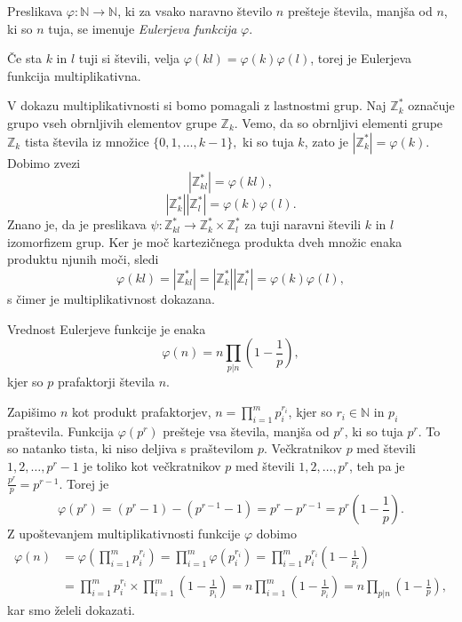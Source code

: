 \documentclass[mat1]{fmfdelo}
\begin{document}
\begin{definicija}
Preslikava \( \varphi \colon \mathbb{N} \rightarrow \mathbb{N}\), ki za vsako naravno število $n$ prešteje števila, manjša od $n$, ki so $n$ tuja, se imenuje \emph{Eulerjeva funkcija} $\varphi$.
\end{definicija}

\begin{trditev}
\label{trd:MultipEuler}
Če sta $k$ in $l$ tuji si števili, velja $\varphi (kl) = \varphi (k) \varphi (l)$, torej je Eulerjeva funkcija multiplikativna.
\end{trditev}

\begin{dokaz}
V dokazu multiplikativnosti si bomo pomagali z lastnostmi grup. 
Naj $\mathbb{Z}_{k}^\ast $ označuje grupo vseh obrnljivih elementov grupe $\mathbb{Z}_{k}$. Vemo, da so obrnljivi elementi grupe $\mathbb{Z}_{k}$ tista števila iz množice \( \{0, 1, \ldots, k-1 \}, \) ki so tuja $k$, zato je $|\mathbb{Z}_{k}^\ast| = \varphi(k).$  
Dobimo zvezi
\[ |\mathbb{Z}_{kl}^\ast| = \varphi(kl), \]
\[ |\mathbb{Z}_{k}^\ast| |\mathbb{Z}_{l}^\ast| = \varphi(k) \varphi(l).\]
Znano je, da je preslikava \( \psi \colon \mathbb{Z}_{kl}^\ast \rightarrow \mathbb{Z}_{k}^\ast \times \mathbb{Z}_{l}^\ast \) za tuji naravni števili $k$ in $l$ izomorfizem grup. Ker je moč kartezičnega produkta dveh množic enaka produktu njunih moči, sledi 
\[ \varphi(kl) = |\mathbb{Z}_{kl}^\ast| = |\mathbb{Z}_{k}^\ast| |\mathbb{Z}_{l}^\ast| = \varphi(k) \varphi(l), \]
s čimer je multiplikativnost dokazana.
\end{dokaz}

\begin{trditev}
\label{trd:EulerPrastProd}
Vrednost Eulerjeve funkcije je enaka
\[ \varphi(n) = n \prod_{p|n} \left (1 - \frac{1}{p} \right ), \] kjer so $p$ prafaktorji števila $n$.
\end{trditev}

\begin{dokaz}
Zapišimo $n$ kot produkt prafaktorjev, \(n=\prod_{i=1}^m p_i^{r_i}\), kjer so $r_i \in \mathbb{N}$ in $p_i$ praštevila.
Funkcija $\varphi(p^{r})$ prešteje vsa števila, manjša od $p^r$, ki so tuja $p^r$. To so natanko tista, ki niso deljiva s praštevilom $p$. Večkratnikov $p$ med števili $1, 2, \ldots, p^r-1$ je toliko kot večkratnikov $p$ med števili $1, 2, \ldots, p^r$, teh pa je \( \frac{p^r}{p} = p^{r-1}. \)
Torej je 
\[ \varphi(p^r) = (p^r - 1) - (p^{r-1} - 1) = p^r - p^{r-1} = p^r \left (1 - \frac{1}{p} \right). \] 
Z upoštevanjem multiplikativnosti funkcije $\varphi$ dobimo
%
\begin{align*}
 \varphi(n) 
 &= \varphi \left (\prod_{i=1}^m p_i^{r_i} \right ) = \prod_{i=1}^m \varphi (p_i^{r_i} ) = 
 \prod_{i=1}^m p_i^{r_i} \left (1 - \frac{1}{p_i} \right ) \\
 &= \prod_{i=1}^m p_i^{r_i} \times \prod_{i=1}^m \left (1 - \frac{1}{p_i} \right ) = 
 n \prod_{i=1}^m \left (1 - \frac{1}{p_i} \right ) = n \prod_{p|n} \left (1 - \frac{1}{p} \right ),
\end{align*}
kar smo želeli dokazati.
\end{dokaz}
%
\end{document}

